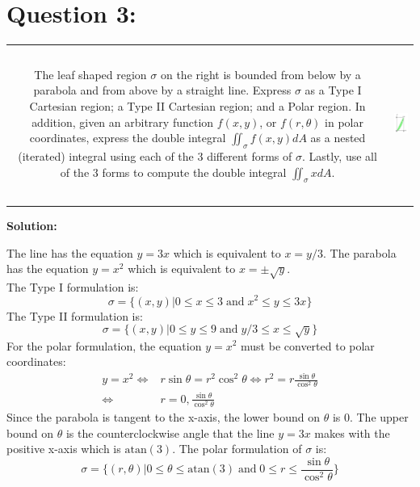 \documentclass{article}
\newcommand{\atan}{\text{atan}}
\newcommand{\dr}[1]{\textcolor{dark_red}{#1}}
\begin{document}
\section*{Question 3:}

\begin{tabular}{cc}
\parbox{0.6\textwidth}{The leaf shaped region \(\sigma\) on the right is bounded from below by a parabola and from above by a straight line. Express \(\sigma\) as a Type I Cartesian region; a Type II Cartesian region; and a Polar region. In addition, given an arbitrary function \(f(x,y)\), or \(f(r,\theta)\) in polar coordinates, express the double integral \(\iint_{\sigma} f(x,y)dA\) as a nested (iterated) integral using each of the 3 different forms of \(\sigma\). Lastly, use all of the 3 forms to compute the double integral \(\iint_{\sigma} x dA\).}
& 
\parbox{0.4\textwidth}{\includegraphics[height = 5cm]{Test_bench_part_3_images/Test_bench_part_3_image_5}}
\end{tabular}

\vspace{5mm}
\dr{\textbf{Solution:}}

\dr{The line has the equation \(y = 3x\) which is equivalent to \(x = y/3\). The parabola has the equation \(y = x^2\) which is equivalent to \(x = \pm \sqrt{y}\). \\
The Type I formulation is:
\[\sigma = \{(x,y) | 0 \leq x \leq 3 \;\text{and}\; x^2 \leq y \leq 3x\}\]
The Type II formulation is:
\[\sigma = \{(x,y) | 0 \leq y \leq 9 \;\text{and}\; y/3 \leq x \leq \sqrt{y}\}\]
For the polar formulation, the equation \(y = x^2\) must be converted to polar coordinates: 
\begin{align*}
y = x^2 \iff & r\sin\theta = r^2\cos^2\theta 
\iff r^2 = r\frac{\sin\theta}{\cos^2\theta} \\
\iff & r = 0, \frac{\sin\theta}{\cos^2\theta}
\end{align*}
Since the parabola is tangent to the x-axis, the lower bound on \(\theta\) is \(0\). The upper bound on \(\theta\) is the counterclockwise angle that the line \(y = 3x\) makes with the positive x-axis which is \(\atan(3)\). The polar formulation of \(\sigma\) is:
\[\sigma = \{(r,\theta) | 0 \leq \theta \leq \atan(3) \;\text{and}\; 0 \leq r \leq \frac{\sin\theta}{\cos^2\theta}\}\] 
}
\end{document}
